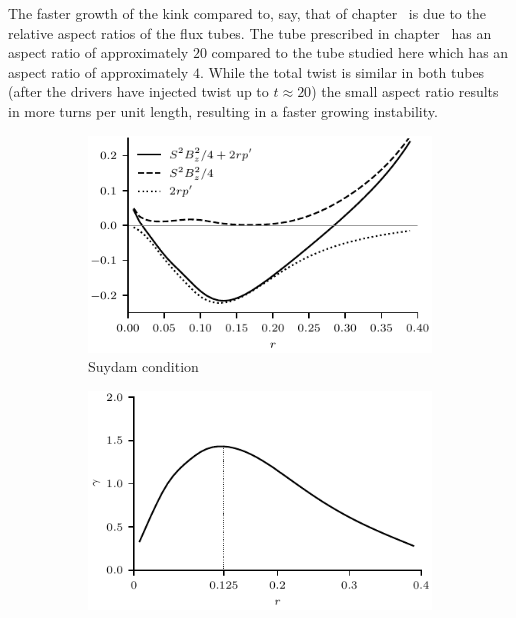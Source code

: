 \documentclass[12pt]{article}
\begin{document}
The faster growth of the kink compared to, say, that of chapter~\cite{quinnEffectAnisotropicViscosity2020a} is due to the relative aspect ratios of the flux tubes. The tube prescribed in chapter~\cite{quinnEffectAnisotropicViscosity2020a} has an aspect ratio of approximately $20$ compared to the tube studied here which has an aspect ratio of approximately $4$. While the total twist is similar in both tubes (after the drivers have injected twist up to $t\approx20$) the small aspect ratio results in more turns per unit length, resulting in a faster growing instability.

\begin{figure}[t]
  \centering
    \begin{subfigure}{0.49\textwidth}
      \includegraphics[width=\linewidth]{suydam_condition_4.pdf}
      \caption{Suydam condition}
      \label{fig:suydam_condition_4}
    \end{subfigure}
    \hfill
    \begin{subfigure}{0.49\textwidth}
      \includegraphics[width=\linewidth]{growth_rate_4.pdf}

\end{subfigure}
\end{figure}
\end{document}
